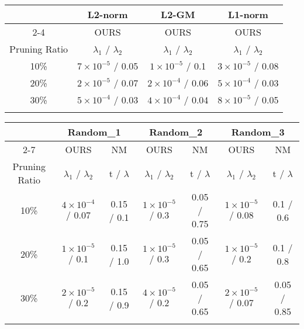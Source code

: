 \begin{table*}[h]
\centering 
\scriptsize
\begin{tabular}{c|c|c|c}\Xhline{2\arrayrulewidth}
\multirow{2}{*}{Criterion} & L2-norm& L2-GM & L1-norm\\ \cline{2-4} 
& OURS& OURS& OURS\\ \hline
Pruning Ratio& $\lambda_1$ / $\lambda_2$    & $\lambda_1$ / $\lambda_2$  & $\lambda_1$ / $\lambda_2$  \\\Xhline{2\arrayrulewidth}
10\%  & $7\times10^{-5}$ / 0.05 & $1\times10^{-5}$ / 0.1 &  $3\times10^{-5}$ / 0.08 \\ \hline
20\%  & $2\times10^{-5}$ / 0.07 & $2\times10^{-4}$ / 0.06 & $5\times10^{-4}$ / 0.03 \\ \hline
30\%  & $5\times10^{-4}$ / 0.03 & $4\times10^{-4}$ / 0.04 & $8\times10^{-5}$ / 0.05 \\ \Xhline{2\arrayrulewidth}
\end{tabular}%
\vspace{1mm}

\begin{tabular}{c|c|c|c|c|c|c}\Xhline{2\arrayrulewidth}
\multirow{2}{*}{Criterion} & \multicolumn{2}{c|}{Random\_1}& \multicolumn{2}{c|}{Random\_2}& \multicolumn{2}{c}{Random\_3}\\ \cline{2-7} 
    & OURS& NM& OURS& NM& OURS& NM\\ \hline
Pruning Ratio& $\lambda_1$ / $\lambda_2$ & t / $\lambda$ & $\lambda_1$ / $\lambda_2$ & t / $\lambda$ & $\lambda_1$ / $\lambda_2$ & t / $\lambda$ \\ \Xhline{2\arrayrulewidth}
10\%& $4\times10^{-4}$ / 0.07 & 0.15 / 0.1    & $1\times10^{-5}$ / 0.3   & 0.05 / 0.75   & $1\times10^{-5}$ / 0.08   & 0.1 / 0.6 \\ \hline
20\%& $1\times10^{-5}$ / 0.1  & 0.15 / 1.0    & $1\times10^{-5}$ / 0.3   & 0.05 / 0.65   & $1\times10^{-5}$ / 0.2    & 0.1 / 0.8 \\ \hline
30\%& $2\times10^{-5}$ / 0.2  & 0.15 / 0.9    & $4\times10^{-5}$ / 0.2   & 0.05 / 0.65   & $2\times10^{-5}$ / 0.07   & 0.05 / 0.85  \\ \Xhline{2\arrayrulewidth}
\end{tabular}%
\caption{hyperparameters of ResNet34 on ImageNet}
\label{tab:param:ResNet34:ImageNet}
\vspace{2mm}



\end{table*}
